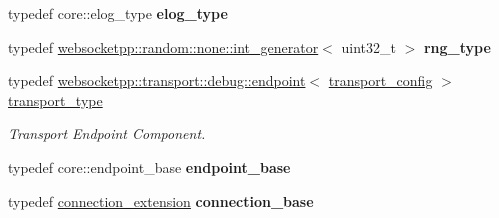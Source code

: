 \begin{DoxyCompactItemize}
\item 
typedef core\+::elog\+\_\+type {\bfseries elog\+\_\+type}\hypertarget{structdebug__config__client_a7d3549099c77db4af97bc3ce3830ffcf}{}\label{structdebug__config__client_a7d3549099c77db4af97bc3ce3830ffcf}

\item 
typedef \hyperlink{classwebsocketpp_1_1random_1_1none_1_1int__generator}{websocketpp\+::random\+::none\+::int\+\_\+generator}$<$ uint32\+\_\+t $>$ {\bfseries rng\+\_\+type}\hypertarget{structdebug__config__client_acb7ac04cb4f63e82e6f809397a91c5de}{}\label{structdebug__config__client_acb7ac04cb4f63e82e6f809397a91c5de}

\item 
typedef \hyperlink{classwebsocketpp_1_1transport_1_1debug_1_1endpoint}{websocketpp\+::transport\+::debug\+::endpoint}$<$ \hyperlink{structdebug__config__client_1_1transport__config}{transport\+\_\+config} $>$ \hyperlink{structdebug__config__client_a5d8a90aa033bf48e51bc40ba38611454}{transport\+\_\+type}\hypertarget{structdebug__config__client_a5d8a90aa033bf48e51bc40ba38611454}{}\label{structdebug__config__client_a5d8a90aa033bf48e51bc40ba38611454}

\begin{DoxyCompactList}\small\item\em Transport Endpoint Component. \end{DoxyCompactList}\item 
typedef core\+::endpoint\+\_\+base {\bfseries endpoint\+\_\+base}\hypertarget{structdebug__config__client_a2bec8c54b40bc46f8e12061f8d5568c4}{}\label{structdebug__config__client_a2bec8c54b40bc46f8e12061f8d5568c4}

\item 
typedef \hyperlink{structconnection__extension}{connection\+\_\+extension} {\bfseries connection\+\_\+base}\hypertarget{structdebug__config__client_a19d48b3bd4c5fbc8a4c6162b10b0c8f0}{}\label{structdebug__config__client_a19d48b3bd4c5fbc8a4c6162b10b0c8f0}

\end{DoxyCompactItemize}
